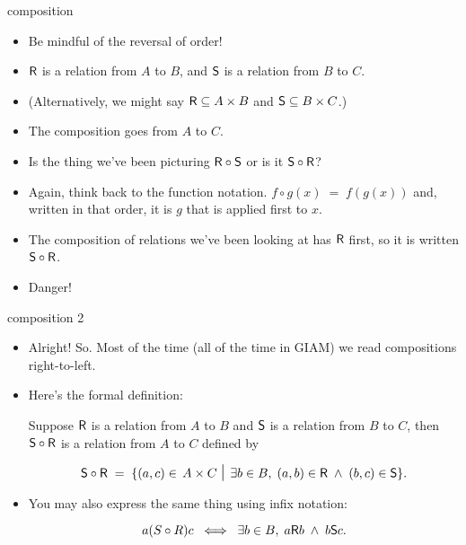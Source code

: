 \documentclass[handout,landscape]{beamer}
\begin{document}
\begin{frame}{composition}
\begin{itemize}
\item Be mindful of the reversal of order!\pause
\item $\mbox{\textsf R}$ is a relation from $A$ to $B$, and $\mbox{\textsf S}$ is a relation from $B$ to $C$. \pause
\item (Alternatively, we might say $\mbox{\textsf R} \subseteq A \times B$ and $\mbox{\textsf S} \subseteq B \times C$.) \pause
\item The composition goes from $A$ to $C$. \pause
\item Is the thing we've been picturing $\mbox{\textsf R} \circ \mbox{\textsf S}$ or is it $\mbox{\textsf S} \circ \mbox{\textsf R}$? \pause
\item Again, think back to the function notation. \pause \newline
$f \circ g (x) \; = \; f(g(x))$ and, written in that order, it is $g$ that is applied first to $x$. \pause
\item The composition of relations we've been looking at has $\mbox{\textsf R}$ first, so it is written $\mbox{\textsf S} \circ \mbox{\textsf R}$. \pause
\item Danger!
\end{itemize}
\end{frame}

\begin{frame}{composition 2}
\begin{itemize}
\item Alright! So.  Most of the time (all of the time in GIAM) we read compositions right-to-left.\pause
\item Here's the formal definition: \pause

Suppose $\mbox{\textsf R}$ is a relation from $A$ to $B$ and $\mbox{\textsf S}$ is a relation from $B$ to $C$, then $\mbox{\textsf S} \circ \mbox{\textsf R}$ is a relation from $A$ to $C$ defined by \pause

\[ \relS \circ \relR \; = \; \{ (a,c) \in \, A \times C \, \suchthat \; \exists b \in B, \; (a,b) \in \relR \; \land \; (b,c) \in \relS \}. \]
\pause

\item You may also express the same thing using infix notation: \pause

\[ a(S\circ R)c \; \iff \; \exists b \in B, \; a\mbox{\textsf R} b \; \land \; b\mbox{\textsf S} c.\]

\end{itemize}
\end{frame}
\end{document}
